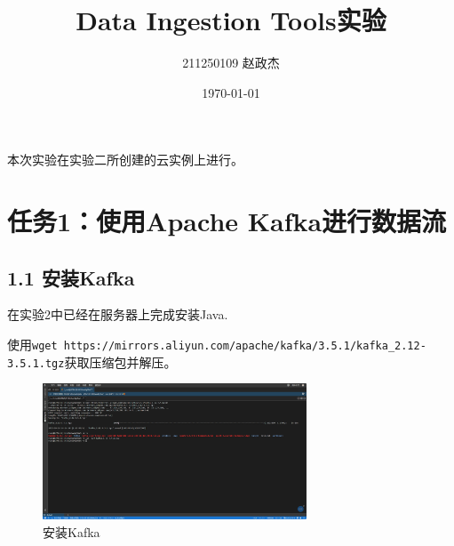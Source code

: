 \documentclass{article}
\begin{document}
\title{Data Ingestion Tools实验}
\author{211250109 赵政杰}
\date{\today}
\maketitle
本次实验在实验二所创建的云实例上进行。
\section{任务1：使用Apache Kafka进行数据流}
\subsection*{1.1 安装Kafka}
在实验2中已经在服务器上完成安装Java.\par
使用\lstinline[style = Style]|wget https://mirrors.aliyun.com/apache/kafka/3.5.1/kafka_2.12-3.5.1.tgz|获取压缩包并解压。
\begin{figure}[H]
    \centering
    \includegraphics[width=0.7\textwidth]{./pic/2.png}
    \caption{安装Kafka}
\end{figure}
\end{document}
